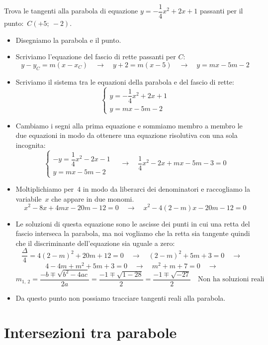\begin{esempio}
 Trova le tangenti alla parabola di equazione \(y=-\dfrac{1}{4}x^2+2x +1\) 
 passanti per il punto:~\(C(+5;~-2)\).
 
 \begin{itemize}
  \item Disegniamo la parabola e il punto.
  \item Scriviamo l'equazione del fascio di rette passanti per \(C\):
\[y-y_C = m(x-x_C) \quad \rightarrow \quad 
y+2 = m\left(x-5\right)
\quad \rightarrow \quad y=mx-5m-2\]
  \item Scriviamo il sistema tra le equazioni della parabola e del fascio di 
   rette:
\[\left\{\begin{array}{l}
  y=-\dfrac{1}{4}x^2+2x +1\\
  y=mx-5m-2
\end{array}\right. \]
  \item Cambiamo i segni alla prima equazione e sommiamo membro a membro le
   due equazioni in modo da ottenere una equazione risolutiva con una sola 
   incognita:
\[\left\{\begin{array}{l}
  -y=\dfrac{1}{4}x^2-2x-1\\
  y=mx-5m-2
\end{array}\right. \quad \rightarrow \quad 
\dfrac{1}{4}x^2-2x+mx-5m-3=0\]
  \item Moltiplichiamo per~\(4\) in modo da liberarci dei denominatori e 
   raccogliamo la variabile~\(x\) che appare in due monomi.
\[x^2-8x+4mx-20m-12=0 \quad \rightarrow \quad x^2-4(2-m)x-20m-12=0\]
  \item Le soluzioni di questa equazione sono le ascisse dei punti in cui una 
   retta del fascio interseca la parabola, ma noi vogliamo che la retta sia
   tangente quindi che il discriminante dell'equazione sia uguale a zero:
\[\dfrac{\Delta}{4}=4(2-m)^2+20m+12=0 \quad \rightarrow \quad 
(2-m)^2+5m+3=0 \quad \rightarrow \quad\]
\[4-4m+m^2+5m+3=0 \quad \rightarrow \quad
m^2+m+7=0 \quad \rightarrow \quad\]
\[m_{1,~2}=\dfrac{-b \mp \sqrt{b^2-4ac}}{2a}=\dfrac{-1 \mp \sqrt{1-28}}{2}=
\dfrac{-1 \mp \sqrt{-27}}{2} \quad \text{Non ha soluzioni reali}\]
  \item Da questo punto non possiamo tracciare tangenti reali alla
   parabola.
 \end{itemize}
\end{esempio}


\section{Intersezioni tra parabole}
\label{sec:parabola_intersezioniparabole}

